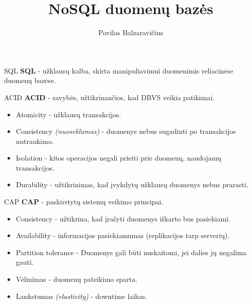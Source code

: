 \documentclass[12pt,a4paper]{beamer}
\author{Povilas Balzaravičius}
\title{NoSQL duomenų bazės}
\institute{M2 technologijos}
\begin{document}
\begin{frame}
	\titlepage
\end{frame}


\begin{frame}{SQL}
	\textbf{SQL} - užklausų kalba, skirta manipuliavimui duomenimis reliacinėse duomenų bazėse.
\end{frame}

\begin{frame}{ACID}
	\textbf{ACID} - savybės, užtikrinančios, kad DBVS veikia patikimai.
	\vskip10pt
	\begin{itemize}
	\item Atomicity - užklausų transakcijos.
	\item Consistency \textit{(nuoseklumas)} - duomenys nebus sugadinti po transakcijos nutraukimo.
	\item Isolation - kitos operacijos negali prieiti prie duomenų, naudojamų transakcijos.
	\item Durability - užtikrinimas, kad įvykdytų užklausų duomenys nebus prarasti.
	\end{itemize}
\end{frame}

\begin{frame}{CAP}
	\textbf{CAP} - paskirstytų sistemų veikimo principai.
	\vskip10pt
	\begin{itemize}
		\item Consistency - užtikrina, kad įrašyti duomenys iškarto bus pasiekiami.
		\item Availability - informacijos pasiekiamumas (replikacijos tarp serverių).
		\item Partition tolerance - Duomenys gali būti nuskaitomi, jei dalies jų negalima gauti.
		\vskip20pt
		\item Vėlinimas - duomenų pateikimo sparta.
		\item Lankstumas \textit{(elasticity)} - downtime laikas.
	\end{itemize}
\end{frame}
\end{document}
